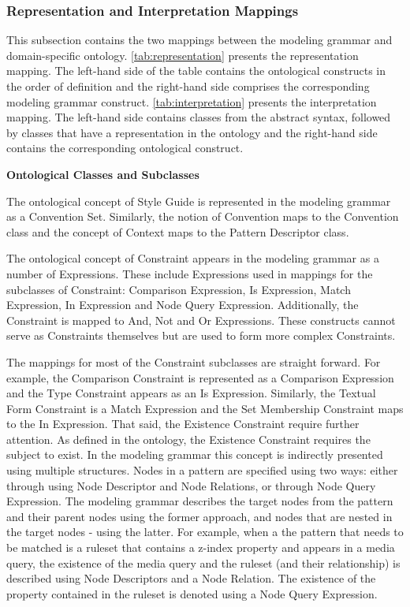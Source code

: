 \subsubsection{Representation and Interpretation Mappings} 

This subsection contains the two mappings between the modeling grammar and domain-specific ontology.
\autoref{tab:representation} presents the representation mapping. The left-hand side of the table
contains the ontological constructs in the order of definition and the right-hand side comprises the
corresponding modeling grammar construct. \autoref{tab:interpretation} presents the interpretation
mapping. The left-hand side contains classes from the abstract syntax, followed by classes that have
a representation in the ontology and the right-hand side contains the corresponding ontological
construct.





\textbf{Ontological Classes and Subclasses}

The ontological concept of Style Guide is represented in the modeling grammar
as a Convention Set. Similarly, the notion of Convention maps to the
Convention class and the concept of Context maps to the Pattern Descriptor
class.

The ontological concept of Constraint appears in the modeling grammar as a
number of Expressions. These include Expressions used in mappings for the
subclasses of Constraint: Comparison Expression, Is Expression, Match
Expression, In Expression and Node Query Expression. Additionally, the
Constraint is mapped to And, Not and Or Expressions. These constructs cannot
serve as Constraints themselves but are used to form more complex Constraints.

The mappings for most of the Constraint subclasses are straight forward. For
example, the Comparison Constraint is represented as a Comparison Expression
and the Type Constraint appears as an Is Expression. Similarly, the Textual
Form Constraint is a Match Expression and the Set Membership Constraint maps
to the In Expression. That said, the Existence Constraint require further
attention. As defined in the ontology, the Existence Constraint requires the
subject to exist. In the modeling grammar this concept is indirectly presented
using multiple structures. Nodes in a pattern are specified using two ways:
either through using Node Descriptor and Node Relations, or through Node Query
Expression. The modeling grammar describes the target nodes from the pattern
and their parent nodes using the former approach, and nodes that are nested in
the target nodes - using the latter. For example, when a the pattern that
needs to be matched is a ruleset that contains a z-index property and appears
in a media query, the existence of the media query and the ruleset (and their
relationship) is described using Node Descriptors and a Node Relation. The
existence of the property contained in the ruleset is denoted using a Node
Query Expression.

